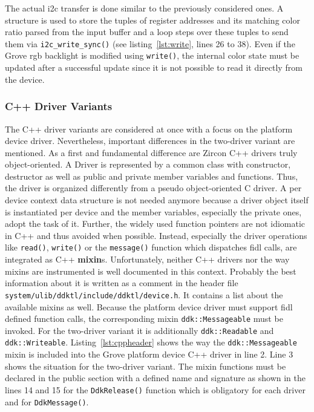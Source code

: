 The actual \ac{i2c} transfer is done similar to the previously considered ones.
A structure is used to store the tuples of register addresses and its matching color ratio parsed from the input buffer and a loop steps over these tuples to send them via \texttt{i2c_write_sync()} (see listing~\ref{lst:write}, lines 26 to 38).
Even if the Grove \ac{rgb} backlight is modified using \texttt{write()}, the internal color state must be updated after a successful update since it is not possible to read it directly from the device.

\subsubsection*{C++ Driver Variants}
The C++ driver variants are considered at once with a focus on the platform device driver.
Nevertheless, important differences in the two-driver variant are mentioned.
As a first and fundamental difference are Zircon C++ drivers truly object-oriented.
A Driver is represented by a common class with constructor, destructor as well as public and private member variables and functions.
Thus, the driver is organized differently from a pseudo object-oriented C driver.
A per device context data structure is not needed anymore because a driver object itself is instantiated per device and the member variables, especially the private ones, adopt the task of it.  
Further, the widely used function pointers are not idiomatic in C++ and thus avoided when possible.
Instead, especially the driver operations like \texttt{read()}, \texttt{write()} or the \texttt{message()} function which dispatches \ac{fidl} calls, are integrated as C++ \textbf{mixin}s.
Unfortunately, neither C++ drivers nor the way mixins are instrumented is well documented in this context.
Probably the best information about it is written as a comment in the header file \texttt{system/ulib/ddktl/include/ddktl/device.h}.
It contains a list about the available mixins as well.
Because the platform device driver must support \ac{fidl} defined function calls, the corresponding mixin \texttt{ddk::Messageable} must be invoked.
For the two-driver variant it is additionally \texttt{ddk::Readable} and \texttt{ddk::Writeable}.
Listing~\ref{lst:cppheader} shows the way the \texttt{ddk::Messageable} mixin is included into the Grove platform device C++ driver in line 2.
Line 3 shows the situation for the two-driver variant.
The mixin functions must be declared in the public section with a defined name and signature as shown in the lines 14 and 15 for the \texttt{DdkRelease()} function which is obligatory for each driver and for \texttt{DdkMessage()}.

